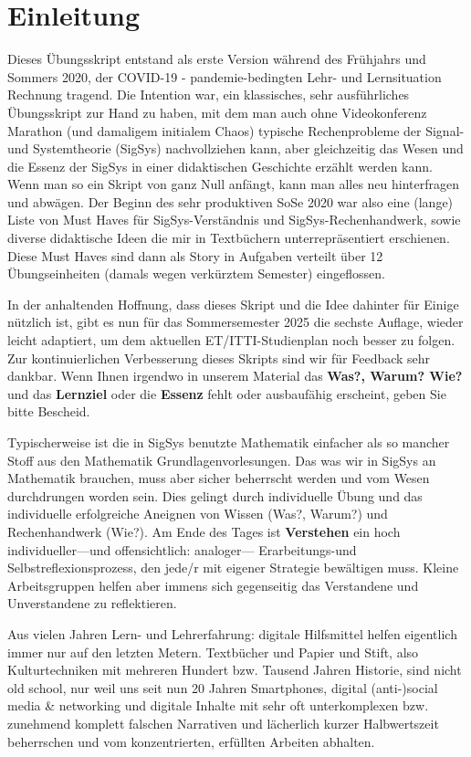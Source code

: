 \newpage
\section*{Einleitung}
%

Dieses Übungsskript entstand als erste Version während des Frühjahrs und Sommers 2020, der
COVID-19 - pandemie-bedingten Lehr- und Lernsituation Rechnung tragend.
%
Die Intention war, ein klassisches, sehr ausführliches Übungsskript zur Hand zu haben,
mit dem man auch ohne Videokonferenz Marathon (und damaligem initialem Chaos)
typische Rechenprobleme der Signal- und Systemtheorie (SigSys) nachvollziehen kann, aber gleichzeitig das Wesen und die Essenz der SigSys in einer didaktischen Geschichte erzählt werden kann.
%
Wenn man so ein Skript von ganz Null anfängt, kann man alles neu hinterfragen und abwägen. Der Beginn des sehr produktiven SoSe 2020 war also eine (lange) Liste von Must Haves für SigSys-Verständnis und SigSys-Rechenhandwerk, sowie diverse didaktische Ideen die mir in Textbüchern unterrepräsentiert erschienen. Diese Must Haves sind dann als Story in Aufgaben verteilt über 12 Übungseinheiten (damals wegen verkürztem Semester) eingeflossen.

In der anhaltenden Hoffnung, dass dieses Skript und die Idee dahinter für Einige nützlich ist, gibt es nun für das Sommersemester 2025 die sechste Auflage, wieder leicht adaptiert,
um dem aktuellen ET/ITTI-Studienplan noch besser zu folgen.
%
Zur kontinuierlichen Verbesserung dieses Skripts sind wir für Feedback sehr dankbar.
%
Wenn Ihnen irgendwo in unserem Material das \textbf{Was?, Warum? Wie?} und das
\textbf{Lernziel} oder die \textbf{Essenz} fehlt oder ausbaufähig erscheint, geben Sie bitte Bescheid.

Typischerweise ist die in SigSys benutzte Mathematik einfacher als so mancher
Stoff aus den Mathematik Grundlagenvorlesungen.
%
Das was wir in SigSys an Mathematik brauchen, muss aber sicher beherrscht werden
und vom Wesen durchdrungen worden sein.
%
Dies gelingt durch individuelle Übung und das individuelle erfolgreiche Aneignen
von Wissen (Was?, Warum?) und Rechenhandwerk (Wie?).
%
Am Ende des Tages ist \textbf{Verstehen} ein hoch individueller---und offensichtlich: analoger---
Erarbeitungs-und Selbstreflexionsprozess, den jede/r mit eigener Strategie bewältigen muss.
%
Kleine Arbeitsgruppen helfen aber immens sich gegenseitig das Verstandene und
Unverstandene zu reflektieren.

Aus vielen Jahren Lern- und Lehrerfahrung: digitale Hilfsmittel helfen eigentlich immer nur auf den letzten Metern. Textbücher und Papier und Stift, also Kulturtechniken mit mehreren Hundert bzw. Tausend Jahren Historie, sind nicht old school, nur weil uns seit nun 20 Jahren Smartphones, digital (anti-)social media \& networking und digitale Inhalte mit sehr oft unterkomplexen bzw. zunehmend komplett falschen Narrativen und lächerlich kurzer Halbwertszeit beherrschen und vom konzentrierten, erfüllten Arbeiten abhalten.


